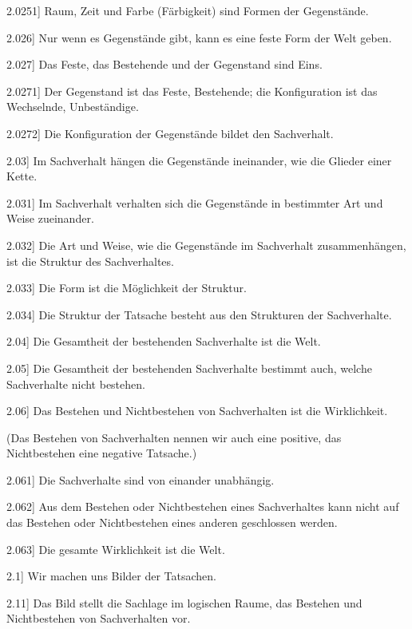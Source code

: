 \documentclass[12pt,oneside]{book}[2007/10/19]
\newcommand{\PropERef}[1]{\hyperref[PropE:#1]{#1}}
\newcommand{\PropositionG}[2]{%
  \item[\phantomsection\label{PropG:#1}\PropERef{#1}] #2%
}
\begin{document}
\begin{propositions}
\PropositionG{2.0251}
{Raum, Zeit und Farbe (Färbigkeit) sind Formen
der Gegenstände.}


\PropositionG{2.026}
{Nur wenn es Gegenstände gibt, kann es eine
feste Form der Welt geben.}


\PropositionG{2.027}
{Das Feste, das Bestehende und der Gegenstand
sind Eins.}


\PropositionG{2.0271}
{Der Gegenstand ist das Feste, Bestehende; die
Konfiguration ist das Wechselnde, Unbeständige.}


\PropositionG{2.0272}
{Die Konfiguration der Gegenstände bildet den
Sachverhalt.}


\PropositionG{2.03}
{Im Sachverhalt hängen die Gegenstände ineinander,
wie die Glieder einer Kette.}


\PropositionG{2.031}
{Im Sachverhalt verhalten sich die Gegenstände
in bestimmter Art und Weise zueinander.}


\PropositionG{2.032}
{Die Art und Weise, wie die Gegenstände im
Sachverhalt zusammenhängen, ist die Struktur
des Sachverhaltes.}


\PropositionG{2.033}
{Die Form ist die Möglichkeit der Struktur.}


\PropositionG{2.034}
{Die Struktur der Tatsache besteht aus den
Strukturen der Sachverhalte.}


\PropositionG{2.04}
{Die Gesamtheit der bestehenden Sachverhalte
ist die Welt.}


\PropositionG{2.05}
{Die Gesamtheit der bestehenden Sachverhalte
bestimmt auch, welche Sachverhalte nicht bestehen.}


\PropositionG{2.06}
{Das Bestehen und Nichtbestehen von Sachverhalten
ist die Wirklichkeit.

(Das Bestehen von Sachverhalten nennen wir
auch eine positive, das Nichtbestehen eine negative
Tatsache.)}


\PropositionG{2.061}
{Die Sachverhalte sind von einander unabhängig.}


\PropositionG{2.062}
{Aus dem Bestehen oder Nichtbestehen eines
Sachverhaltes kann nicht auf das Bestehen oder
Nichtbestehen eines anderen geschlossen werden.}


\PropositionG{2.063}
{Die gesamte Wirklichkeit ist die Welt.}


\PropositionG{2.1}
{Wir machen uns Bilder der Tatsachen.}


\PropositionG{2.11}
{Das Bild stellt die Sachlage im logischen Raume,
das Bestehen und Nichtbestehen von Sachverhalten
vor.}



\end{propositions}
\end{document}

